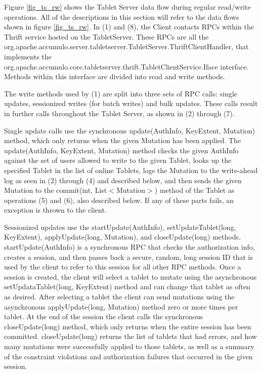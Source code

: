 \documentclass[letterpaper,onecolumn,12pt,titlepage]{article}
\begin{document}
Figure \ref{fig_ts_rw} shows the Tablet Server data flow during regular read/write operations.
All of the descriptions in this section will refer to the data flows shown in figure \ref{fig_ts_rw}.
In (1) and (8), the Client contacts RPCs within the Thrift service hosted on the TabletServer.  
These RPCs are all the org.apache.accumulo.server.tabletserver.TabletServer.ThriftClientHandler, that implements the org.apache.accumulo.core.tabletserver.thrift.TabletClientService.Iface interface.
Methods within this interface are divided into read and write methods.

The write methods used by (1) are split into three sets of RPC calls: single updates, sessionized writes (for batch writes) and bulk updates.
These calls result in further calls throughout the Tablet Server, as shown in (2) through (7).

Single update calls use the synchronous update(AuthInfo, KeyExtent, Mutation) method, which only returns when the given Mutation has been applied.
The update(AuthInfo, KeyExtent, Mutation) method checks the given AuthInfo against the set of users allowed to write to the given Tablet, 
looks up the specified Tablet in the list of online Tablets, logs the Mutation to the write-ahead log as seen in (2) through (4) and described below, 
and then sends the given Mutation to the commit(int, List$<$Mutation$>$) method of the Tablet as operations (5) and (6), also described below.
If any of these parts fails, an exception is thrown to the client.

Sessionized updates use the startUpdate(AuthInfo), setUpdateTablet(long, KeyExtent), applyUpdate(long, Mutation), and closeUpdate(long) methods.
startUpdate(AuthInfo) is a synchronous RPC that checks the authorization info, creates a session, and then passes back a secure, random, long session ID that is used by the client to refer to this session for all other RPC methods.
Once a session is created, the client will select a tablet to mutate using the asynchronous setUpdataTablet(long, KeyExtent) method and can change that tablet as often as desired.
After selecting a tablet the client can send mutations using the asynchronous applyUpdate(long, Mutation) method zero or more times per tablet.
At the end of the session the client calls the synchronous closeUpdate(long) method, which only returns when the entire session has been committed.
closeUpdate(long) returns the list of tablets that had errors, and how many mutations were successfully applied to those tablets, as well as a summary of the constraint violations and authorization failures that occurred in the given session.
\end{document}
